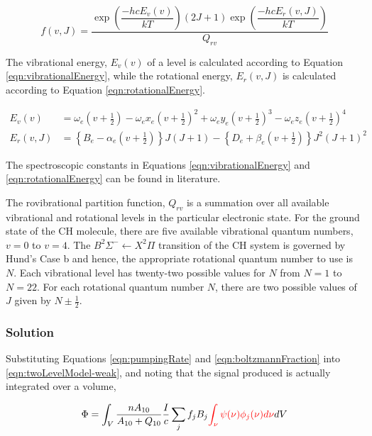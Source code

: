 \begin{equation}
  f(v,J) = \frac{ \exp{\left(\dfrac{-hcE_v(v)}{kT}\right)} (2J + 1)\exp{\left(\dfrac{-hcE_r(v, J)}{kT}\right)} }{ Q_{rv} }
  \label{eqn:boltzmannDistribution}
\end{equation}

The vibrational energy, \(E_v(v)\) of a level is calculated according to Equation \ref{eqn:vibrationalEnergy}, while the rotational energy, \(E_r(v,J)\) is calculated according to Equation \ref{eqn:rotationalEnergy}.

\begin{align}
  E_v(v) &= \omega_e \left(v+\frac{1}{2}\right) - \omega_ex_e \left(v+\frac{1}{2}\right)^2 + \omega_ey_e \left(v+\frac{1}{2}\right)^3 - \omega_ez_e \left(v+\frac{1}{2}\right)^4
  \label{eqn:vibrationalEnergy}\\
  E_r(v, J) &= \left\{B_e - \alpha_e \left(v+\frac{1}{2}\right)\right\}J(J+1) - \left\{D_e + \beta_e \left(v+\frac{1}{2}\right)\right\}J^2(J+1)^2
  \label{eqn:rotationalEnergy}
\end{align}

The spectroscopic constants in Equations \ref{eqn:vibrationalEnergy} and \ref{eqn:rotationalEnergy} can be found in literature\cite{1995-zachwieja}.

The rovibrational partition function, \(Q_{rv}\) is a summation over all available vibrational and rotational levels in the particular electronic state.
For the ground state of the CH molecule, there are five available vibrational quantum numbers, \(v = 0\) to \(v = 4\).
The \(B^2\Sigma^-\leftarrow X^2\Pi\) transition of the CH system is governed by Hund's Case b and hence, the appropriate rotational quantum number to use is \(N\).
Each vibrational level has twenty-two possible values for \(N\) from \(N = 1\) to \(N = 22\).
For each rotational quantum number \(N\), there are two possible values of \(J\) given by \(N \pm \frac{1}{2}\).

\subsubsection{Solution}

Substituting Equations \ref{eqn:pumpingRate} and \ref{eqn:boltzmannFraction} into \ref{eqn:twoLevelModel-weak}, and noting that the signal produced is actually integrated over a volume,

\begin{equation}
  \Phi = \int_V \frac{n A_{10}}{A_{10} + Q_{10}} \frac{I}{c} \sum_j f_j B_j \textcolor{red}{\int_\nu \psi(\nu) \phi_j(\nu) d\nu} dV
  \label{eqn:twoLevelModel-unsimplified}
\end{equation}

